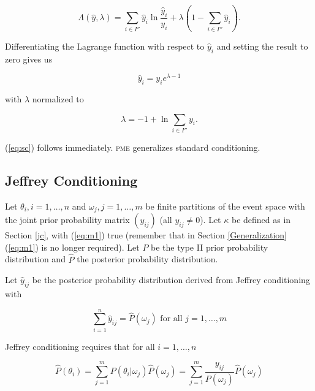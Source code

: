 \begin{equation}
  \label{eq:sclag}
  \Lambda(\hat{y},\lambda)=\sum_{i\in{}I''}\hat{y}_{i}\ln\frac{\hat{y}_{i}}{y_{i}}+\lambda\left(1-\sum_{i\in{}I''}\hat{y}_{i}\right).
\end{equation}

{\noindent}Differentiating the Lagrange function with respect to $\hat{y}_{i}$ and
setting the result to zero gives us

\begin{equation}
  \label{eq:sc1}
  \hat{y}_{i}=y_{i}e^{\lambda-1}
\end{equation}

{\noindent}with $\lambda$ normalized to

\begin{equation}
  \label{eq:sc2}
  \lambda=-1+\ln{}\sum_{i\in{}I''}y_{i}.
\end{equation}

{\noindent}(\ref{eq:sc}) follows immediately. \textsc{pme} generalizes standard conditioning.

\subsection{Jeffrey Conditioning}
\label{jco}

Let $\theta_{i},i=1,\ldots,n$ and $\omega_{j},j=1,\ldots,m$ be finite
partitions of the event space with the joint prior probability matrix
$(y_{ij})$ (all $y_{ij}\neq{}0$). Let $\kappa$ be defined as in
Section \ref{jc}, with (\ref{eq:m1}) true (remember that in Section
\ref{Generalization} (\ref{eq:m1}) is no longer required). Let $P$ be
the type II prior probability distribution and $\hat{P}$ the posterior
probability distribution.

Let $\hat{y}_{ij}$ be the posterior probability distribution derived
from Jeffrey conditioning with

\begin{equation}
  \label{eq:jc1}
  \sum_{i=1}^{n}\hat{y}_{ij}=\hat{P}(\omega_{j})\mbox{ for all }j=1,\ldots,m
\end{equation}

{\noindent}Jeffrey conditioning requires that for all $i=1,\ldots,n$

\begin{equation}
  \label{eq:jc2}
  \hat{P}(\theta_{i})=\sum_{j=1}^{m}P(\theta_{i}|\omega_{j})\hat{P}(\omega_{j})=\sum_{j=1}^{m}\frac{y_{ij}}{P(\omega_{j})}\hat{P}(\omega_{j})
\end{equation}

